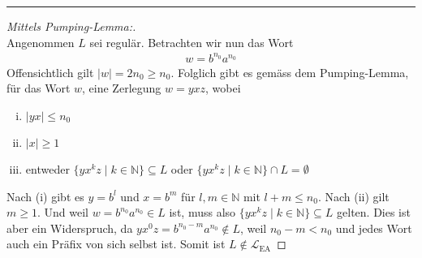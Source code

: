 \documentclass[a4paper,ngerman,12pt]{exam}
\begin{document}
\begin{questions}
\begin{solutionorbox}[22em]
      \hrule

      \begin{proof}[Mittels Pumping-Lemma:] $ $\\
        Angenommen $L$ sei regulär. Betrachten wir nun das Wort
        \begin{align*}
          w = b^{n_0}a^{n_0}
        \end{align*}
        Offensichtlich gilt $|w| = 2n_0  \geq n_0$.
        Folglich gibt es gemäss dem Pumping-Lemma, für das Wort $w$, eine Zerlegung
        $w = yxz$, wobei
        \begin{enumerate}[(i)]
          \item $|yx| \leq n_0$
          \item $|x| \geq 1$
          \item entweder $\{y x^k z \mid k \in \mathbb{N}\} \subseteq L$
            oder $\{y x^k z \mid k \in \mathbb{N}\} \cap L = \emptyset$
        \end{enumerate}
        Nach (i) gibt es $y = b^l$ und $x = b^m$ für $l,m \in \mathbb{N}$
        mit $l+m \leq n_0$. Nach (ii) gilt $m \geq 1$. Und weil
        $w = b^{n_0}a^{n_0} \in L$ ist, muss also
        $\{y x^k z \mid k \in \mathbb{N}\} \subseteq L$ gelten. Dies ist aber ein
        Widerspruch, da $yx^0z = b^{n_0-m}a^{n_0} \not\in L$,
        weil $n_0 - m < n_0$ und jedes Wort auch ein Präfix von sich selbst ist.
        Somit ist
        $L \not\in \mathcal{L}_{\mathrm{EA}}$
      \end{proof}
    \end{solutionorbox}


\end{questions}
\end{document}
